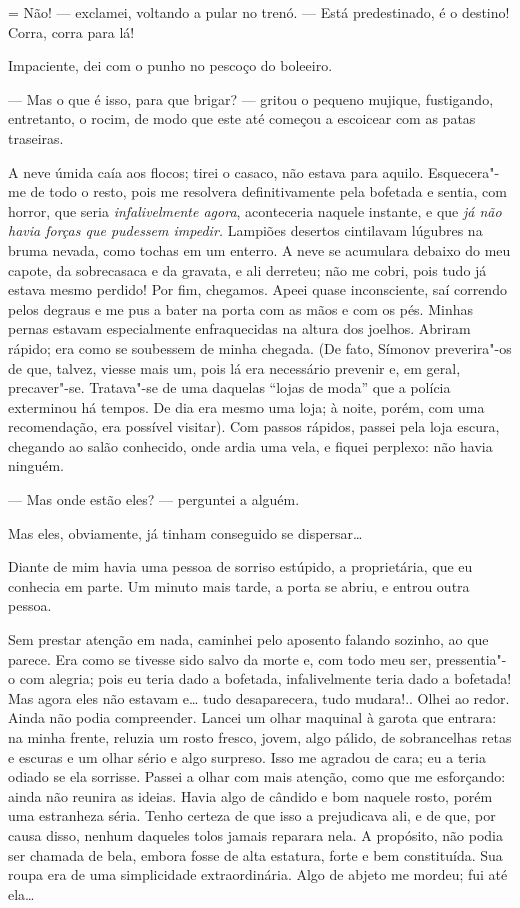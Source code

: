 = Não! --- exclamei, voltando a pular no trenó. --- Está predestinado, é o
destino! Corra, corra para lá!

Impaciente, dei com o punho no pescoço do boleeiro.

--- Mas o que é isso, para que brigar? --- gritou o pequeno mujique,
fustigando, entretanto, o rocim, de modo que este até começou a
escoicear com as patas traseiras.

A neve úmida caía aos flocos; tirei o casaco, não estava para aquilo.
Esquecera"-me de todo o resto, pois me resolvera definitivamente pela
bofetada e sentia, com horror, que seria \emph{infalivelmente agora},
aconteceria naquele instante, e que \emph{já não havia forças que
pudessem impedir.} Lampiões desertos cintilavam lúgubres na bruma
nevada, como tochas em um enterro. A neve se acumulara debaixo do meu
capote, da sobrecasaca e da gravata, e ali derreteu; não me cobri, pois
tudo já estava mesmo perdido! Por fim, chegamos. Apeei quase
inconsciente, saí correndo pelos degraus e me pus a bater na porta com
as mãos e com os pés. Minhas pernas estavam especialmente enfraquecidas
na altura dos joelhos. Abriram rápido; era como se soubessem de minha
chegada. (De fato, Símonov preverira"-os de que, talvez, viesse mais um,
pois lá era necessário prevenir e, em geral, precaver"-se. Tratava"-se de
uma daquelas ``lojas de moda'' que a polícia exterminou há tempos. De
dia era mesmo uma loja; à noite, porém, com uma recomendação, era
possível visitar). Com passos rápidos, passei pela loja escura, chegando
ao salão conhecido, onde ardia uma vela, e fiquei perplexo: não havia
ninguém.

--- Mas onde estão eles? --- perguntei a alguém.

Mas eles, obviamente, já tinham conseguido se dispersar\ldots{}

Diante de mim havia uma pessoa de sorriso estúpido, a proprietária, que
eu conhecia em parte. Um minuto mais tarde, a porta se abriu, e entrou
outra pessoa.

Sem prestar atenção em nada, caminhei pelo aposento falando sozinho, ao
que parece. Era como se tivesse sido salvo da morte e, com todo meu ser,
pressentia"-o com alegria; pois eu teria dado a bofetada, infalivelmente
teria dado a bofetada! Mas agora eles não estavam e\ldots{} tudo
desaparecera, tudo mudara!.. Olhei ao redor. Ainda não podia
compreender. Lancei um olhar maquinal à garota que entrara: na minha
frente, reluzia um rosto fresco, jovem, algo pálido, de sobrancelhas
retas e escuras e um olhar sério e algo surpreso. Isso me agradou de
cara; eu a teria odiado se ela sorrisse. Passei a olhar com mais
atenção, como que me esforçando: ainda não reunira as ideias. Havia algo
de cândido e bom naquele rosto, porém uma estranheza séria. Tenho
certeza de que isso a prejudicava ali, e de que, por causa disso, nenhum
daqueles tolos jamais reparara nela. A propósito, não podia ser chamada
de bela, embora fosse de alta estatura, forte e bem constituída. Sua
roupa era de uma simplicidade extraordinária. Algo de abjeto me mordeu;
fui até ela\ldots{}

